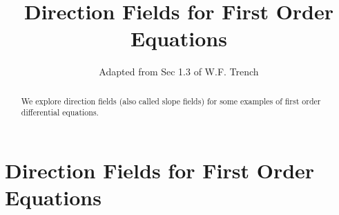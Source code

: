 \documentclass{ximera}
\title{Direction Fields for First Order Equations}
\author{Adapted from Sec 1.3 of W.F. Trench}
\begin{document}
 
\begin{abstract}
We explore direction fields (also called slope fields) for some examples of first order differential equations.
\end{abstract}
 
\maketitle
 
\section*{Direction Fields for First Order Equations}
 
 
   
 
\end{document}
